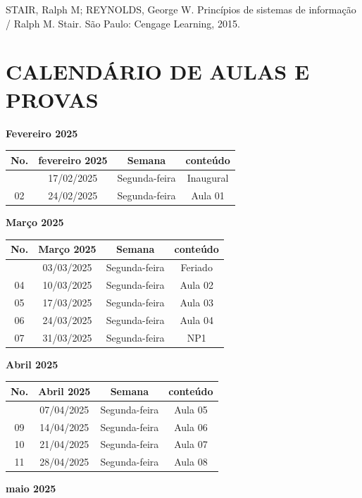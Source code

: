 \documentclass[
]{book}
\begin{document}
STAIR, Ralph M; REYNOLDS, George W. Princípios de sistemas de informação / Ralph M. Stair. São Paulo: Cengage Learning, 2015.

\section{CALENDÁRIO DE AULAS E PROVAS}\label{calenduxe1rio-de-aulas-e-provas}

\textbf{Fevereiro 2025}

\begin{longtable}[]{@{}cccc@{}}
\toprule\noalign{}
No. & fevereiro 2025 & Semana & conteúdo \\
\midrule\noalign{}
\endhead
\bottomrule\noalign{}
\endlastfoot
01 & 17/02/2025 & Segunda-feira & Inaugural \\
02 & 24/02/2025 & Segunda-feira & Aula 01 \\
\end{longtable}

\textbf{Março 2025}

\begin{longtable}[]{@{}cccc@{}}
\toprule\noalign{}
No. & Março 2025 & Semana & conteúdo \\
\midrule\noalign{}
\endhead
\bottomrule\noalign{}
\endlastfoot
03 & 03/03/2025 & Segunda-feira & Feriado \\
04 & 10/03/2025 & Segunda-feira & Aula 02 \\
05 & 17/03/2025 & Segunda-feira & Aula 03 \\
06 & 24/03/2025 & Segunda-feira & Aula 04 \\
07 & 31/03/2025 & Segunda-feira & NP1 \\
\end{longtable}

\textbf{Abril 2025}

\begin{longtable}[]{@{}cccc@{}}
\toprule\noalign{}
No. & Abril 2025 & Semana & conteúdo \\
\midrule\noalign{}
\endhead
\bottomrule\noalign{}
\endlastfoot
08 & 07/04/2025 & Segunda-feira & Aula 05 \\
09 & 14/04/2025 & Segunda-feira & Aula 06 \\
10 & 21/04/2025 & Segunda-feira & Aula 07 \\
11 & 28/04/2025 & Segunda-feira & Aula 08 \\
\end{longtable}

\textbf{maio 2025}
\end{document}
